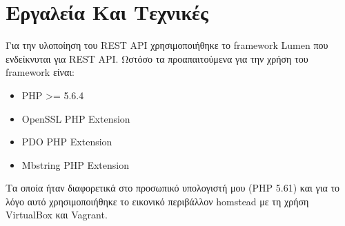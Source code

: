 \section{Εργαλεία Και Τεχνικές}

Για την υλοποίηση του REST API χρησιμοποιήθηκε το framework\footnotemark{} Lumen \cite{DUMMY:1} που ενδείκνυται για REST API. Ωστόσο τα προαπαιτούμενα για την χρήση του framework είναι:  

\begin{itemize}
\item PHP >= 5.6.4
\item OpenSSL PHP Extension
\item PDO PHP Extension
\item Mbstring PHP Extension
\end{itemize}

Τα οποία ήταν διαφορετικά στο προσωπικό υπολογιστή μου (PHP 5.61) και για το λόγο αυτό χρησιμοποιήθηκε το εικονικό περιβάλλον homstead με τη χρήση VirtualBox και Vagrant.